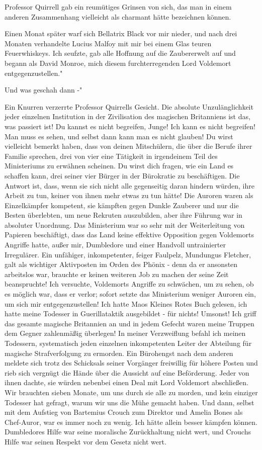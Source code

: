 Professor Quirrell gab ein reumütiges Grinsen von sich, das man in einem anderen
Zusammenhang vielleicht als charmant hätte bezeichnen können.

\glqq Einen Monat später warf sich Bellatrix Black vor mir nieder, und nach drei
Monaten verhandelte Lucius Malfoy mit mir bei einem Glas teuren Feuerwhiskeys.
Ich seufzte, gab alle Hoffnung auf die Zaubererwelt auf und begann als David
Monroe, mich diesem furchterregenden Lord Voldemort entgegenzustellen."

\glqq Und was geschah dann -"

Ein Knurren verzerrte Professor Quirrells Gesicht. \glqq Die absolute
Unzulänglichkeit jeder einzelnen Institution in der Zivilisation des magischen
Britanniens ist das, was passiert ist! Du kannst es nicht begreifen, Junge! Ich
kann es nicht begreifen! Man muss es sehen, und selbst dann kann man es nicht
glauben! Du wirst vielleicht bemerkt haben, dass von deinen Mitschülern, die
über die Berufe ihrer Familie sprechen, drei von vier eine Tätigkeit in
irgendeinem Teil des Ministeriums zu erwähnen scheinen. Du wirst dich fragen,
wie ein Land es schaffen kann, drei seiner vier Bürger in der Bürokratie zu
beschäftigen. Die Antwort ist, dass, wenn sie sich nicht alle gegenseitig daran
hindern würden, ihre Arbeit zu tun, keiner von ihnen mehr etwas zu tun hätte!
Die Auroren waren als Einzelkämpfer kompetent, sie kämpften gegen Dunkle
Zauberer und nur die Besten überlebten, um neue Rekruten auszubilden, aber ihre
Führung war in absoluter Unordnung. Das Ministerium war so sehr mit der
Weiterleitung von Papieren beschäftigt, dass das Land keine effektive Opposition
gegen Voldemorts Angriffe hatte, außer mir, Dumbledore und einer Handvoll
untrainierter Irregulärer. Ein unfähiger, inkompetenter, feiger Faulpelz,
Mundungus Fletcher, galt als wichtiger Aktivposten im Orden des Phönix - denn da
er ansonsten arbeitslos war, brauchte er keinen weiteren Job zu machen der seine
Zeit beanspruchte! Ich versuchte, Voldemorts Angriffe zu schwächen, um zu sehen,
ob es möglich war, dass er verlor; sofort setzte das Ministerium weniger Auroren
ein, um sich mir entgegenzustellen! Ich hatte Maos Kleines Rotes Buch gelesen,
ich hatte meine Todesser in Guerillataktik ausgebildet - für nichts! Umsonst!
Ich griff das gesamte magische Britannien an und in jedem Gefecht waren meine
Truppen dem Gegner zahlenmäßig überlegen! In meiner Verzweiflung befahl ich
meinen Todessern, systematisch jeden einzelnen inkompetenten Leiter der
Abteilung für magische Strafverfolgung zu ermorden. Ein Bürohengst nach dem
anderen meldete sich trotz des Schicksals seiner Vorgänger freiwillig für höhere
Posten und rieb sich vergnügt die Hände über die Aussicht auf eine Beförderung.
Jeder von ihnen dachte, sie würden nebenbei einen Deal mit Lord Voldemort
abschließen. Wir brauchten sieben Monate, um uns durch sie alle zu morden, und
kein einziger Todesser hat gefragt, warum wir uns die Mühe gemacht haben. Und
dann, selbst mit dem Aufstieg von Bartemius Crouch zum Direktor und Amelia Bones
als Chef-Auror, war es immer noch zu wenig. Ich hätte allein besser kämpfen
können. Dumbledores Hilfe war seine moralische Zurückhaltung nicht wert, und
Crouchs Hilfe war seinen Respekt vor dem Gesetz nicht wert.\grqq{}

